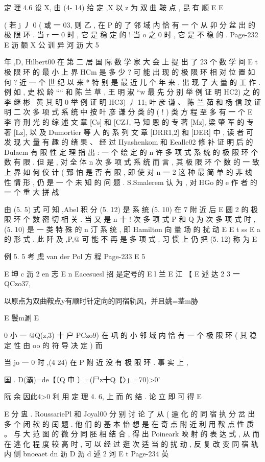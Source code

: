 {{{{{{{{{{{{{定 理 4.6 设 X, 由 (4- 14) 给 定 ,X 以 z 为 双 曲 鞍 点 , 昆 有 顺
E
E

( 若 j 丿 0 ( 或 一 03, 则 乙 , 在 P 的 了 邻 域 内 恰 有 一 个
从 卯 分 盆 出 的 极 限 环 . 当 r 一 0 时 , 它 是 稳 定 的 ! 当 o 之 0 时 , 它
是 不 稳 的 .
Page-232
E 沥 额 X 公 训 异 河 沥 大 5

年 ,D, Hilbert00 在 第 二 居 国 际 数 学 家 大 会 上 提 出 了 23 个 数 学 间
E t
极 限 环 的 最 小 上 界 HCm 是 多 少 ? 可 能 出 现 的 极 限 环 相 对 位 置 如
何 ? 近 一 个 世 纪 以 来 * 特 别 是 最 近 儿 个 年 来 , 出 现 了 大 量 的 工 作 .
例 如 , 史 松 龄 ““ 和 陈 兰 草 , 王 明 淑 “w 最 先 分 别 举 例 证 明 HC2) 之
的 李 继 彬 \ 黄 其 明 0 举 例 证 明 HC3) 丿 11; 叶 彦 谦 、 陈 兰 茹 和 杨 信
玟
证 明 二 次 多 项 式 系 统 中 按 叶 彦 谦 分 类 的 ( ! ) 类 方 程 至 多 有 一 个
E 李 育 刑
光 的 综 述 文 章 [Cs] 和 [CZJ, 马 知 恩 的 专 著 [Mz], 梁 肇 军 的 专 著
[Lz], 以 及 Dumortier 等 人 的 系 列 文 章 [DRR1,2] 和 [DER] 中 , 读
者 可 发 现 大 量 有 趣 的 绪 果 、 经 过 IIyashenkom 和 Eealle02 修 补 证
明 后 的 Dulaem 有 限 性 定 理 指 出 : 一 个 绘 定 的 n 许 多 项 式 系 统 的 极
限 环 个 数 有 限 . 但 是 , 对 全 体 n 次 多 项 式 系 统 而 言 , 其 极 限 环 个 数
的 一 致 上 界 如 何 佼 计 ( 郅 怕 是 否 有 限 , 即 使 对 n 一 2 这 种 最 简 单 的
非 线 性 情 形 , 仍 是 一 个 未 知 的 问 题 . S.Smalerem 认 为 , 对 HGo 的
e
作 者 的 一 个 重 大 拼 战

由 (5. 5) 式 可 知 ,Abel 积 分 (5. 12) 是 系 统 (5. 10) 在 7 附 近 后
E 圆 2
的 极 限 环 个 数 密 切 相 关 . 当 又 是 n 十 ! 次 多 项 式 P 和 Q 为 次 多
项 式 时 ,(5. 10) 是 一 类 特 殊 的 n 汀 系 统 , 即 Hamilton 向 量 场 的 扰 动
E
E t ss
E a
的 形 式 . 此 阡 及 ,P,@ 可 能 不 再 是 多 项 式 . 习 惯 上 仍 把 (5. 12) 称 为
E

例 5. 5 考 虑 van der Pol 方 程
Page-233
E 5

E 坤 c 沥 2 en 志
E
n
Eacesuesl 招 是定号的 E
l 兰
E 江
【 E 述 达 2
3 一 QCzo37,

以原点为双曲鞍点y有顺时针定向的同宿轨风，并且姚=茎m胁

E 鬟m涮 E
{ 0
小 一 @Q(z,3) 十 户 PCzo9)
在 巩 的 小 邻 域 内 恰 有 一 个 极 限 环 ( 其 稳 定 性 由 oo 的 符 导 决 定 ) 而

当 jo 一 0 时 ,(4 24) 在 P 附 近 没 有 极 限 环 .
事 实 上 ,

国
. D(灞)=de【〔Q 申 〕=(尸z十Q【〉」=70)>0'

阮 余 因此4>0 利 用 定 理 4. 6, 上 而 的 结 .
论 立 即 可 得
E

E
分 盅 . RoussariePl 和 Joyal00 分 别 讨 论 了 从 ( 逾 化 的 同 宿 执 分 岔
出 多 个 闭 软 的 闰 题 . 他 们 的 基 本 怡 想 是 在 奇 点 附 近 利 用 鞍 点 性 质 。
与 大 范 图 的 微 分 同 胚 相 结 合 , 得 出 Poineark 映 射 的 表 达 式 , 从 而 在
逃 化 程 度 较 高 时 , 可 以 经 过 逛 次 适 当 的 扰 动 , 反 复 改 变 同 宿 轨 内 侧
bnoeaet dn 沥
D 沥 d 述 2 河
E t
Page-234
英

}}}}}}}}}}}}}}
